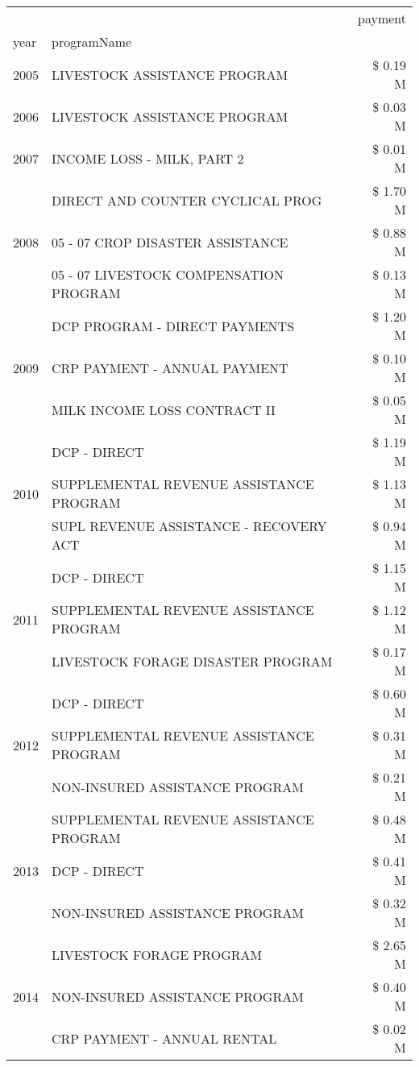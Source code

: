 \begin{tabular}{llr}
\toprule
 &  & payment \\
year & programName &  \\
\midrule
2005 & LIVESTOCK ASSISTANCE PROGRAM & \$ 0.19 M \\
\cline{1-3}
2006 & LIVESTOCK ASSISTANCE PROGRAM & \$ 0.03 M \\
\cline{1-3}
2007 & INCOME LOSS - MILK, PART 2 & \$ 0.01 M \\
\cline{1-3}
\multirow[t]{3}{*}{2008} & DIRECT AND COUNTER CYCLICAL PROG & \$ 1.70 M \\
 & 05 - 07 CROP DISASTER ASSISTANCE & \$ 0.88 M \\
 & 05 - 07 LIVESTOCK COMPENSATION PROGRAM & \$ 0.13 M \\
\cline{1-3}
\multirow[t]{3}{*}{2009} & DCP PROGRAM - DIRECT PAYMENTS & \$ 1.20 M \\
 & CRP PAYMENT - ANNUAL PAYMENT & \$ 0.10 M \\
 & MILK INCOME LOSS CONTRACT II & \$ 0.05 M \\
\cline{1-3}
\multirow[t]{3}{*}{2010} & DCP - DIRECT & \$ 1.19 M \\
 & SUPPLEMENTAL REVENUE ASSISTANCE PROGRAM & \$ 1.13 M \\
 & SUPL REVENUE ASSISTANCE - RECOVERY ACT & \$ 0.94 M \\
\cline{1-3}
\multirow[t]{3}{*}{2011} & DCP - DIRECT & \$ 1.15 M \\
 & SUPPLEMENTAL REVENUE ASSISTANCE PROGRAM & \$ 1.12 M \\
 & LIVESTOCK FORAGE DISASTER PROGRAM & \$ 0.17 M \\
\cline{1-3}
\multirow[t]{3}{*}{2012} & DCP - DIRECT & \$ 0.60 M \\
 & SUPPLEMENTAL REVENUE ASSISTANCE PROGRAM & \$ 0.31 M \\
 & NON-INSURED ASSISTANCE PROGRAM & \$ 0.21 M \\
\cline{1-3}
\multirow[t]{3}{*}{2013} & SUPPLEMENTAL REVENUE ASSISTANCE PROGRAM & \$ 0.48 M \\
 & DCP - DIRECT & \$ 0.41 M \\
 & NON-INSURED ASSISTANCE PROGRAM & \$ 0.32 M \\
\cline{1-3}
\multirow[t]{3}{*}{2014} & LIVESTOCK FORAGE PROGRAM & \$ 2.65 M \\
 & NON-INSURED ASSISTANCE PROGRAM & \$ 0.40 M \\
 & CRP PAYMENT - ANNUAL RENTAL & \$ 0.02 M \\
\cline{1-3}

\end{tabular}
